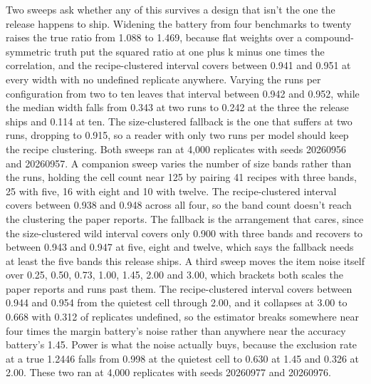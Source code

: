 Two sweeps ask whether any of this survives a design that isn't the one the release happens to ship. Widening the battery from four benchmarks to twenty raises the true ratio from 1.088 to 1.469, because flat weights over a compound-symmetric truth put the squared ratio at one plus k minus one times the correlation, and the recipe-clustered interval covers between 0.941 and 0.951 at every width with no undefined replicate anywhere. Varying the runs per configuration from two to ten leaves that interval between 0.942 and 0.952, while the median width falls from 0.343 at two runs to 0.242 at the three the release ships and 0.114 at ten. The size-clustered fallback is the one that suffers at two runs, dropping to 0.915, so a reader with only two runs per model should keep the recipe clustering. Both sweeps ran at 4,000 replicates with seeds 20260956 and 20260957. A companion sweep varies the number of size bands rather than the runs, holding the cell count near 125 by pairing 41 recipes with three bands, 25 with five, 16 with eight and 10 with twelve. The recipe-clustered interval covers between 0.938 and 0.948 across all four, so the band count doesn't reach the clustering the paper reports. The fallback is the arrangement that cares, since the size-clustered wild interval covers only 0.900 with three bands and recovers to between 0.943 and 0.947 at five, eight and twelve, which says the fallback needs at least the five bands this release ships. A third sweep moves the item noise itself over 0.25, 0.50, 0.73, 1.00, 1.45, 2.00 and 3.00, which brackets both scales the paper reports and runs past them. The recipe-clustered interval covers between 0.944 and 0.954 from the quietest cell through 2.00, and it collapses at 3.00 to 0.668 with 0.312 of replicates undefined, so the estimator breaks somewhere near four times the margin battery's noise rather than anywhere near the accuracy battery's 1.45. Power is what the noise actually buys, because the exclusion rate at a true 1.2446 falls from 0.998 at the quietest cell to 0.630 at 1.45 and 0.326 at 2.00. These two ran at 4,000 replicates with seeds 20260977 and 20260976.

